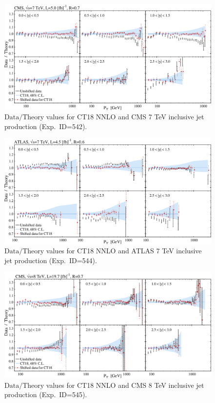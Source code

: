 %
\begin{figure}[p]
\includegraphics[width=1.0\textwidth]{./fig/data_542_CT18__com_DoT_hori_ect.pdf}
\caption{$\mathrm{Data}/\mathrm{Theory}$ values for CT18 NNLO and  CMS 7 TeV inclusive jet production (Exp.~ID=542).
\label{fig:DoT542}
}
\end{figure}
%
\begin{figure}[p]
\includegraphics[width=1.0\textwidth]{./fig/data_544_CT18__com_DoT_hori_ect.pdf}
\caption{$\mathrm{Data}/\mathrm{Theory}$ values for CT18 NNLO and ATLAS 7 TeV inclusive jet production (Exp.~ID=544).
\label{fig:DoT544}
}
\end{figure}
%
\begin{figure}[p]
\includegraphics[width=1.0\textwidth]{./fig/data_545_CT18__com_DoT_hori_ect.pdf}
\caption{$\mathrm{Data}/\mathrm{Theory}$ values for CT18 NNLO and CMS 8 TeV inclusive jet production (Exp.~ID=545).
\label{fig:DoT545}
}
\end{figure}


